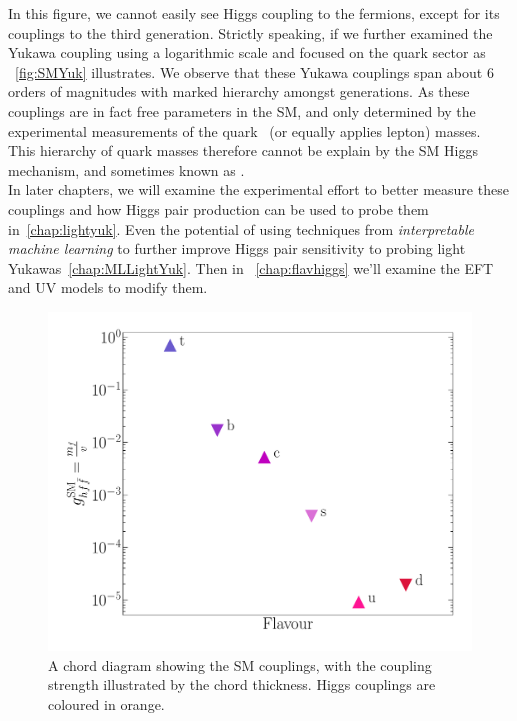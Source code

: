 In this figure, we cannot easily see Higgs coupling to the fermions, except for its couplings to the third generation. Strictly speaking, if we further examined the Yukawa coupling using a logarithmic scale and focused on the quark sector as ~\autoref{fig:SMYuk} illustrates. We observe that these Yukawa couplings span about 6 orders of magnitudes with marked hierarchy amongst generations.  As these couplings are in fact free parameters in the SM, and only determined by the experimental measurements of the quark ~(or equally applies lepton) masses. This hierarchy of quark masses therefore cannot be explain by the SM Higgs mechanism, and sometimes known as .  \\ In later chapters, we will examine the experimental effort to better measure these couplings and how Higgs pair production can be used to probe them in~\autoref{chap:lightyuk}. Even the potential of using techniques from \emph{interpretable machine learning} to further improve Higgs pair sensitivity to probing light Yukawas~\autoref{chap:MLLightYuk}. Then in ~\autoref{chap:flavhiggs} we'll examine the EFT and UV models to modify them. 
\begin{figure}[htpb!]
	\centering
	\includegraphics[width=0.5\linewidth]{./figures/yukawa}
	\caption{A chord diagram showing the SM couplings, with the coupling strength illustrated by the chord thickness. Higgs couplings are coloured in orange.}  \label{fig:SMYuk}
\end{figure}
